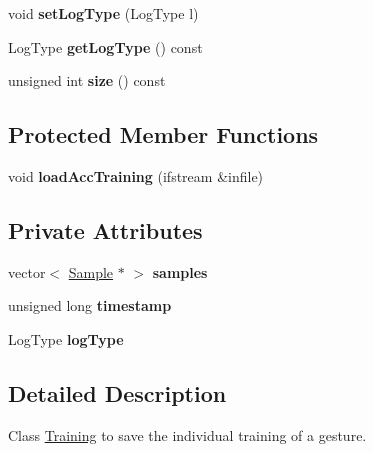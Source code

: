 \begin{DoxyCompactItemize}
\item 
\hypertarget{class_training_a70170c11ac3fe14b840fdb5484ad4247}{void {\bfseries set\-Log\-Type} (Log\-Type l)}\label{class_training_a70170c11ac3fe14b840fdb5484ad4247}

\item 
\hypertarget{class_training_af43ee4618a0620d940d95d88470440d4}{Log\-Type {\bfseries get\-Log\-Type} () const }\label{class_training_af43ee4618a0620d940d95d88470440d4}

\item 
\hypertarget{class_training_a34cd1e59fb499746963c510de4ea8a31}{unsigned int {\bfseries size} () const }\label{class_training_a34cd1e59fb499746963c510de4ea8a31}

\end{DoxyCompactItemize}
\subsection*{Protected Member Functions}
\begin{DoxyCompactItemize}
\item 
\hypertarget{class_training_adab700ca2a1d928fcceb0a7d1c515830}{void {\bfseries load\-Acc\-Training} (ifstream \&infile)}\label{class_training_adab700ca2a1d928fcceb0a7d1c515830}

\end{DoxyCompactItemize}
\subsection*{Private Attributes}
\begin{DoxyCompactItemize}
\item 
\hypertarget{class_training_a552318082a3618fd28e38cd4f37d8bf8}{vector$<$ \hyperlink{class_sample}{Sample} $\ast$ $>$ {\bfseries samples}}\label{class_training_a552318082a3618fd28e38cd4f37d8bf8}

\item 
\hypertarget{class_training_a9eac3dfdc171b6c301f1d2a9b3dfd846}{unsigned long {\bfseries timestamp}}\label{class_training_a9eac3dfdc171b6c301f1d2a9b3dfd846}

\item 
\hypertarget{class_training_a252abea8bd5504538e2d7f2a415d4927}{Log\-Type {\bfseries log\-Type}}\label{class_training_a252abea8bd5504538e2d7f2a415d4927}

\end{DoxyCompactItemize}


\subsection{Detailed Description}
Class \hyperlink{class_training}{Training} to save the individual training of a gesture. 

